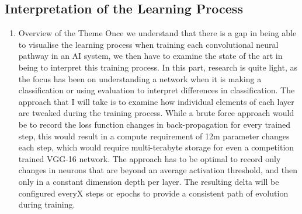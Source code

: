 \subsection{Interpretation of the Learning Process}
\begin{enumerate}
    \item Overview of the Theme
    Once we understand that there is a gap in being able to visualise the learning process when training each convolutional neural pathway in an AI system, we then have to examine the state of the art in being to interpret this training process. In this part, research is quite light, as the focus has been on understanding a network when it is making a classification or using evaluation to interpret differences in classification. The approach that I will take is to examine how individual elements of each layer are tweaked during the training process. While a brute force approach would be to record the loss function changes in back-propagation for every trained step, this would result in a compute requirement of 12m parameter changes each step, which would require multi-terabyte storage for even a competition trained VGG-16 network. The approach has to be optimal to record only changes in neurons that are beyond an average activation threshold, and then only in a constant dimension depth per layer. The resulting delta will be configured everyX steps or epochs to provide a consistent path of evolution during training.


\end{enumerate}
